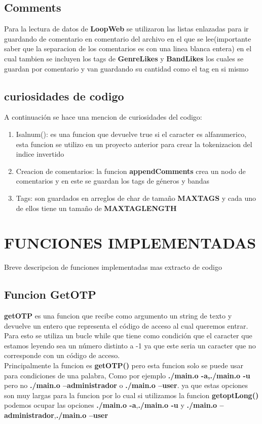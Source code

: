 \subsection*{Comments}
Para la lectura de datos de \textbf{LoopWeb} se utilizaron las listas enlazadas para ir guardando de comentario en comentario del archivo 
en el que se lee(importante saber que la separacion de los comentarios es con una linea blanca entera)
en el cual tambien se incluyen los tags de \textbf{GenreLikes} y \textbf{BandLikes} los cuales se guardan por comentario
y van guardando su cantidad como el tag en si mismo 
\subsection*{curiosidades de codigo} 
A continuación se hace una mencion de curiosidades del codigo:
\begin{enumerate}
    \item Isalnum(): es una funcion que devuelve true si el caracter es alfanumerico, esta funcion se utilizo en un proyecto anterior para crear la tokenizacion del indice invertido
    \item Creacion de comentarios: la funcion \textbf{appendComments} crea un nodo de comentarios y en este se guardan los tags de géneros y bandas
    \item Tags: son guardados en arreglos de char de tamaño \textbf{MAXTAGS} y cada uno de ellos tiene un tamaño de \textbf{MAXTAGLENGTH}
\end{enumerate}

\section{FUNCIONES IMPLEMENTADAS}
Breve descripcion de funciones implementadas mas extracto de codigo

\subsection*{Funcion GetOTP}
\textbf{getOTP} es una funcion que recibe como argumento un string de texto y devuelve un entero que representa
el código de acceso al cual queremos entrar. Para esto se utiliza un bucle while que tiene como condición que el caracter
que estamos leyendo sea un número distinto a -1 ya que este seria un caracter que no corresponde con un código de acceso.\\
Principalmente la funcion es \textbf{getOTP()} pero esta funcion solo se puede usar para condiciones de una palabra, Como por ejemplo
\textbf{./main.o -a,./main.o -u} pero no \textbf{./main.o --administrador} o \textbf{./main.o --user}. ya que estas opciones son muy largas para la funcion
por lo cual si utilizamos la funcion \textbf{getoptLong()} podemos ocupar las opciones \textbf{./main.o -a},\textbf{./main.o -u} y \textbf{./main.o --administrador},\textbf{./main.o --user}
